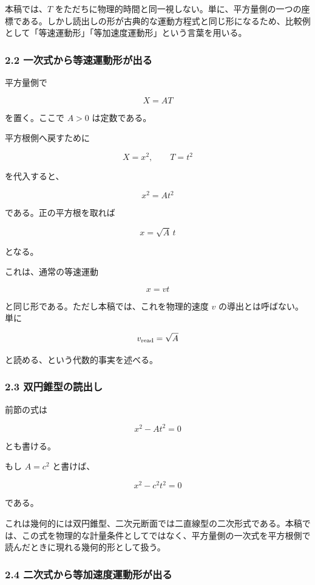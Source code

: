 \documentclass[
]{ltjsarticle}
\begin{document}
本稿では、\(T\)
をただちに物理的時間と同一視しない。単に、平方量側の一つの座標である。しかし読出しの形が古典的な運動方程式と同じ形になるため、比較例として「等速運動形」「等加速度運動形」という言葉を用いる。

\subsubsection{2.2
一次式から等速運動形が出る}\label{ux4e00ux6b21ux5f0fux304bux3089ux7b49ux901fux904bux52d5ux5f62ux304cux51faux308b}

平方量側で

\[
X=A T
\]

を置く。ここで \(A>0\) は定数である。

平方根側へ戻すために

\[
X=x^2,\qquad T=t^2
\]

を代入すると、

\[
x^2=A t^2
\]

である。正の平方根を取れば

\[
x=\sqrt{A}\,t
\]

となる。

これは、通常の等速運動

\[
x=vt
\]

と同じ形である。ただし本稿では、これを物理的速度 \(v\)
の導出とは呼ばない。単に

\[
v_{\rm read}=\sqrt{A}
\]

と読める、という代数的事実を述べる。

\subsubsection{2.3
双円錐型の読出し}\label{ux53ccux5186ux9310ux578bux306eux8aadux51faux3057}

前節の式は

\[
x^2-A t^2=0
\]

とも書ける。

もし \(A=c^2\) と書けば、

\[
x^2-c^2t^2=0
\]

である。

これは幾何的には双円錐型、二次元断面では二直線型の二次形式である。本稿では、この式を物理的な計量条件としてではなく、平方量側の一次式を平方根側で読んだときに現れる幾何的形として扱う。

\subsubsection{2.4
二次式から等加速度運動形が出る}\label{ux4e8cux6b21ux5f0fux304bux3089ux7b49ux52a0ux901fux5ea6ux904bux52d5ux5f62ux304cux51faux308b}
\end{document}
